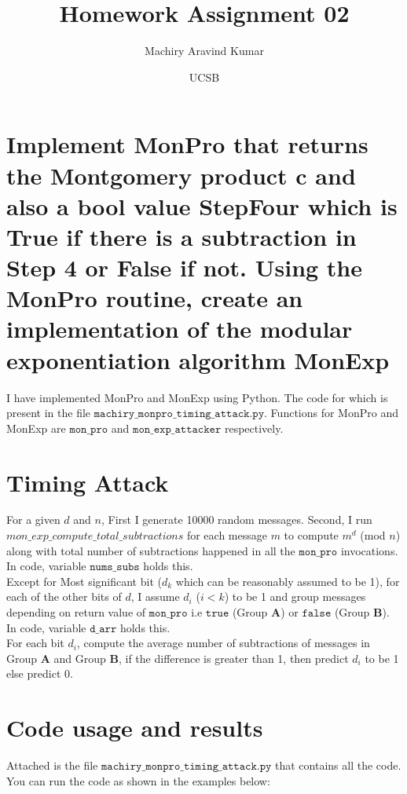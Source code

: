 \documentclass[11pt, pdftex]{article}
\title{Homework Assignment 02}
\author{Machiry Aravind Kumar}
\date{UCSB}
\begin{document}
\maketitle
\section{Implement MonPro that returns the Montgomery product c and also a bool value StepFour which is True if there is a subtraction in Step 4 or False if not. Using the MonPro routine, create an implementation of the modular exponentiation algorithm MonExp}
I have implemented MonPro and MonExp using Python. The code for which is present in the file $\texttt{machiry\_monpro\_timing\_attack.py}$. Functions for MonPro and MonExp are $\texttt{mon\_pro}$ and $\texttt{mon\_exp\_attacker}$ respectively.
\section{Timing Attack}
For a given $d$ and $n$, First I generate 10000 random messages. Second, I run $mon\_exp\_compute\_total\_subtractions$  for each message $m$ to compute $m^{d}$ (mod $n$) along with total number of subtractions happened in all the $\texttt{mon\_pro}$ invocations. In code, variable $\texttt{nums\_subs}$ holds this.\\
Except for Most significant bit ($d_{k}$ which can be reasonably assumed to be 1), for each of the other bits of $d$, I assume $d_{i}$ ($i < k$) to be 1 and group messages depending on return value of $\texttt{mon\_pro}$ i.e $\texttt{true}$ (Group $\textbf{A}$) or $\texttt{false}$ (Group $\textbf{B}$). In code, variable $\texttt{d\_arr}$ holds this.\\
For each bit $d_{i}$, compute the average number of subtractions of messages in Group $\textbf{A}$ and Group $\textbf{B}$, if the difference is greater than 1, then predict $d_{i}$ to be 1 else predict 0.
\section{Code usage and results}
Attached is the file $\texttt{machiry\_monpro\_timing\_attack.py}$ that contains all the code. You can run the code as shown in the examples below:
\end{document}
